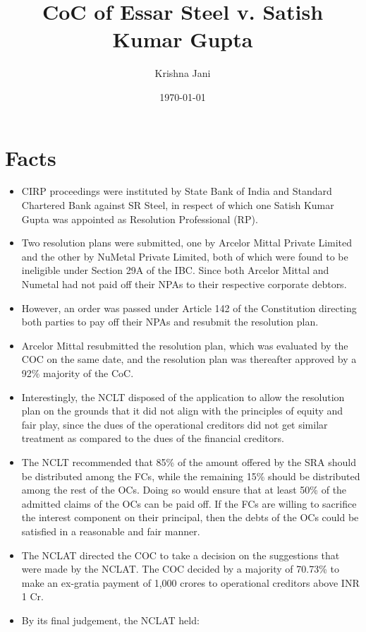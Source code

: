 \documentclass[12pt]{article}
\author{Krishna Jani}
\date{\today}
\title{CoC of Essar Steel v. Satish Kumar Gupta}
\begin{document}
\maketitle

\section*{Facts}

\begin{itemize}
	\item CIRP proceedings were instituted by State Bank of India and Standard Chartered Bank against SR Steel, in respect of which one Satish Kumar Gupta was appointed as Resolution Professional (RP).
	\item Two resolution plans were submitted, one by Arcelor Mittal Private Limited and the other by NuMetal Private Limited, both of which were found to be ineligible under Section 29A of the IBC. Since both Arcelor Mittal and Numetal had not paid off their NPAs to their respective corporate debtors.
	\item However, an order was passed under Article 142 of the Constitution directing both parties to pay off their NPAs and resubmit the resolution plan.
	\item Arcelor Mittal resubmitted the resolution plan, which was evaluated by the COC on the same date, and the resolution plan was thereafter approved by a 92\% majority of the CoC.
	\item Interestingly, the NCLT disposed of the application to allow the resolution plan on the grounds that it did not align with the principles of equity and fair play, since the dues of the operational creditors did not get similar treatment as compared to the dues of the financial creditors.
	\item The NCLT recommended that 85\% of the amount offered by the SRA should be distributed among the FCs, while the remaining 15\% should be distributed among the rest of the OCs. Doing so would ensure that at least 50\% of the admitted claims of the OCs can be paid off. If the FCs are willing to sacrifice the interest component on their principal, then the debts of the OCs could be satisfied in a reasonable and fair manner.
	\item The NCLAT directed the COC to take a decision on the suggestions that were made by the NCLAT. The COC decided by a majority of 70.73\% to make an ex-gratia payment of 1,000 crores to operational creditors above INR 1 Cr.
	\item By its final judgement, the NCLAT held:

\end{itemize}
\end{document}
